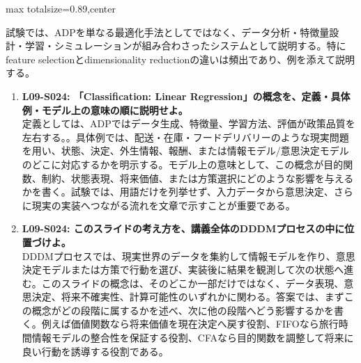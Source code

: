 \begin{minipage}[t]{0.58\textwidth}
\begin{adjustbox}{max totalsize={\textwidth}{0.89\textheight},center}
\begin{minipage}{\textwidth}
試験では、ADPを単なる最適化手法としてではなく、データ分析・特徴量設計・学習・シミュレーションが組み合わさったシステムとして説明する。特にfeature selectionとdimensionality reductionの違いは頻出であり、例を添えて説明する。\par{}\begin{enumerate}\item \textbf{L09-S024: 「Classification: Linear Regression」の概念を、定義・具体例・モデル上の意味の順に説明せよ。}\\定義としては、ADPではデータ生成、特徴量、学習方法、評価が政策品質を左右する。。具体例では、配送・在庫・フードデリバリーのような現実問題を用い、状態、決定、外生情報、報酬、または情報モデル/意思決定モデルのどこに対応するかを明示する。モデル上の意味として、この概念が目的関数、制約、状態表現、将来価値、または方策選択にどのような影響を与えるかを書く。試験では、用語だけを列挙せず、入力データから意思決定、さらに現実の実装へつながる流れを文章で示すことが重要である。\item \textbf{L09-S024: このスライドの考え方を、講義全体のDDDMプロセスの中に位置づけよ。}\\DDDMプロセスでは、現実世界のデータを集約して情報モデルを作り、意思決定モデルまたは方策で行動を選び、実装後に結果を観測して次の状態へ進む。このスライドの概念は、そのどこか一部だけではなく、データ表現、意思決定、将来不確実性、計算可能性のいずれかに関わる。答案では、まずこの概念がどの段階に属するかを述べ、次に他の段階へどう影響するかを書く。例えば価値関数なら将来価値を現在決定へ戻す役割、FIFOなら旅行時間情報モデルの整合性を保証する役割、CFAなら目的関数を調整して将来に良い行動を誘導する役割である。\end{enumerate}
\end{minipage}
\end{adjustbox}
\end{minipage}


